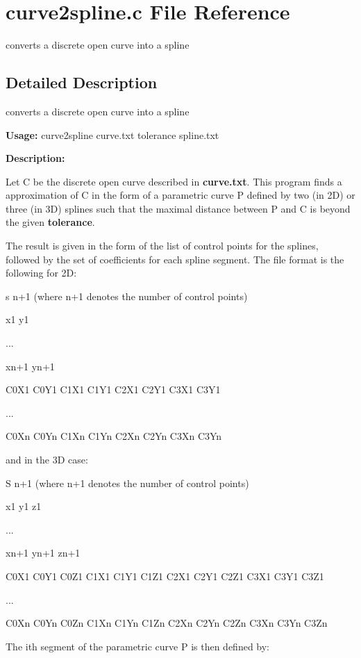 \section{curve2spline.c File Reference}
\label{curve2spline_8c}
converts a discrete open curve into a spline 



\subsection{Detailed Description}
converts a discrete open curve into a spline 

{\bf Usage:} curve2spline curve.txt tolerance spline.txt

{\bf Description:}

Let C be the discrete open curve described in {\bf curve.txt}. This program finds a approximation of C in the form of a parametric curve P defined by two (in 2D) or three (in 3D) splines such that the maximal distance between P and C is beyond the given {\bf tolerance}.

The result is given in the form of the list of control points for the splines, followed by the set of coefficients for each spline segment. The file format is the following for 2D:

s n+1 (where n+1 denotes the number of control points)\par
 x1 y1\par
 ...\par
 xn+1 yn+1\par
 C0X1 C0Y1 C1X1 C1Y1 C2X1 C2Y1 C3X1 C3Y1\par
 ...\par
 C0Xn C0Yn C1Xn C1Yn C2Xn C2Yn C3Xn C3Yn\par


and in the 3D case:

S n+1 (where n+1 denotes the number of control points)\par
 x1 y1 z1\par
 ...\par
 xn+1 yn+1 zn+1\par
 C0X1 C0Y1 C0Z1 C1X1 C1Y1 C1Z1 C2X1 C2Y1 C2Z1 C3X1 C3Y1 C3Z1\par
 ...\par
 C0Xn C0Yn C0Zn C1Xn C1Yn C1Zn C2Xn C2Yn C2Zn C3Xn C3Yn C3Zn\par


The ith segment of the parametric curve P is then defined by:


